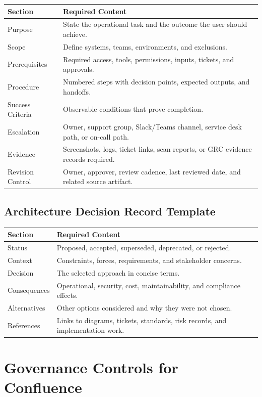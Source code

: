 \documentclass[10pt,letterpaper]{article}
\begin{document}
\begin{tabularx}{\textwidth}{L{1.6in} Y}
\toprule
\textbf{Section} & \textbf{Required Content} \\
\midrule
Purpose & State the operational task and the outcome the user should achieve. \\
Scope & Define systems, teams, environments, and exclusions. \\
Prerequisites & Required access, tools, permissions, inputs, tickets, and approvals. \\
Procedure & Numbered steps with decision points, expected outputs, and handoffs. \\
Success Criteria & Observable conditions that prove completion. \\
Escalation & Owner, support group, Slack/Teams channel, service desk path, or on-call path. \\
Evidence & Screenshots, logs, ticket links, scan reports, or GRC evidence records required. \\
Revision Control & Owner, approver, review cadence, last reviewed date, and related source artifact. \\
\bottomrule
\end{tabularx}

\subsection{Architecture Decision Record Template}

\begin{tabularx}{\textwidth}{L{1.6in} Y}
\toprule
\textbf{Section} & \textbf{Required Content} \\
\midrule
Status & Proposed, accepted, superseded, deprecated, or rejected. \\
Context & Constraints, forces, requirements, and stakeholder concerns. \\
Decision & The selected approach in concise terms. \\
Consequences & Operational, security, cost, maintainability, and compliance effects. \\
Alternatives & Other options considered and why they were not chosen. \\
References & Links to diagrams, tickets, standards, risk records, and implementation work. \\
\bottomrule
\end{tabularx}

\section{Governance Controls for Confluence}
\end{document}

